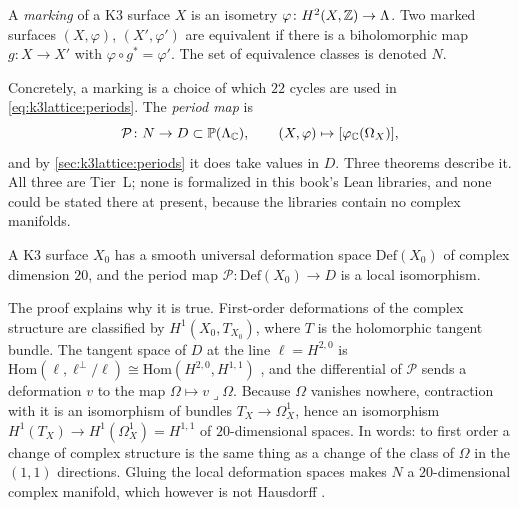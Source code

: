 \begin{definition}[Marking]\label{def:k3lattice:marking}
A \emph{marking} of a K3 surface $X$ is an isometry $\varphi\colon H^2(X,\mathbb{Z})\to\Lambda$. Two
marked surfaces $(X,\varphi)$, $(X',\varphi')$ are equivalent if there is a biholomorphic
map $g\colon X\to X'$ with $\varphi\circ g^*=\varphi'$. The set of equivalence classes is
denoted $N$. 
\end{definition}
Concretely, a marking is a choice of which $22$ cycles are used in
\eqref{eq:k3lattice:periods}. The \emph{period map} is
\begin{equation}\label{eq:k3lattice:periodmap}
 \mathcal P\colon N\to D\subset\mathbb P(\Lambda_{\mathbb{C}}),\qquad
 (X,\varphi)\mapsto[\varphi_{\mathbb{C}}(\Omega_X)] ,
\end{equation}
and by \cref{sec:k3lattice:periods} it does take values in $D$. Three theorems describe it.
All three are Tier~L; none is formalized in this book's Lean libraries, and none could be
stated there at present, because the libraries contain no complex manifolds.

\begin{theorem}\label{thm:k3lattice:local}
A K3 surface $X_0$ has a smooth universal deformation space $\mathrm{Def}(X_0)$ of complex
dimension $20$, and the period map $\mathcal P\colon\mathrm{Def}(X_0)\to D$ is a local
isomorphism. \TL{} 
\end{theorem}
The proof explains why it is true. First-order deformations of the complex structure are
classified by $H^1(X_0,T_{X_0})$, where $T$ is the holomorphic tangent bundle. The tangent
space of $D$ at the line $\ell=H^{2,0}$ is $\mathrm{Hom}(\ell,\ell^\perp/\ell)\cong
\mathrm{Hom}(H^{2,0},H^{1,1})$ , and the
differential of $\mathcal P$ sends a deformation $v$ to the map $\Omega\mapsto v\lrcorner
\Omega$. Because $\Omega$ vanishes nowhere, contraction with it is an isomorphism of bundles
$T_X\to\Omega^1_X$, hence an isomorphism $H^1(T_X)\to H^1(\Omega^1_X)=H^{1,1}$ of
$20$-dimensional spaces. In words: to first order a change of complex structure is the same
thing as a change of the class of $\Omega$ in the $(1,1)$ directions. Gluing the local
deformation spaces makes $N$ a $20$-dimensional complex manifold, which however is not
Hausdorff .

